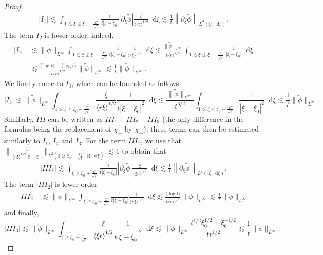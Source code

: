 \documentclass[11 pt]{amsart}
\theoremstyle{definition}
\theoremstyle{remark}
\numberwithin{equation}{section}
\newcommand{\dd}{\mathop{}\!\mathrm{d}}
\begin{document}
\begin{proof}
\begin{align*}
| I_1 | \lesssim \int_{ 1 \lesssim \xi \leq \xi_0 - \frac{C}{\sqrt t}} \frac{1}{t|\xi - \xi_0|} |\partial_\xi \widetilde{\phi}| \frac{\xi}{\langle r \xi\rangle^{1/2}} \dd \xi \lesssim \frac 1 t \left\| \partial_\xi \widetilde{\phi} \right\|_{L^2(|\xi|\dd \xi)}.
\end{align*}
The term $I_2$ is lower order: indeed,
\begin{align*}
|I_2| & \lesssim \| \widetilde{\phi} \|_{L^\infty} \int_{ 1 \lesssim \xi \leq \xi_0 - \frac{C}{\sqrt t}} \frac{1}{t|\xi - \xi_0|} \frac{1}{\langle r \xi\rangle^{1/2} } \dd \xi \lesssim \frac{\| \widetilde{\phi} \|_{L^\infty}}{t \langle r \rangle^{1/2}} \int_{ 1 \lesssim \xi \leq \xi_0 - \frac{C}{\sqrt t}}\frac{1}{|\xi - \xi_0|} \dd \xi \\
& \lesssim \frac{\langle \log t \rangle + \langle \log r \rangle}{t \langle r \rangle^{1/2}} \| \widetilde{\phi} \|_{L^\infty} \lesssim \frac 1 t \| \widetilde{\phi} \|_{L^\infty}.
\end{align*}
We finally come to $I_3$, which can be bounded as follows
$$
|I_3| \lesssim  \| \widetilde{\phi} \|_{L^\infty} \int_{ 1 \lesssim \xi \leq \xi_0 - \frac{C}{\sqrt t}} \frac{\xi}{\langle r \xi \rangle^{1/2}} \frac{1}{t |\xi - \xi_0|^2} \dd \xi \lesssim \frac{\| \widetilde{\phi} \|_{L^\infty}}{t^{3/2}} \int_{ 1 \lesssim \xi \leq \xi_0 - \frac{C}{\sqrt t}} \frac{1}{ |\xi - \xi_0|^2} \dd \xi \lesssim \frac{1}{t} \|  \widetilde{\phi} \|_{L^\infty}.
$$
Similarly, $III$ can be written as $III_1 + III_2 + III_3$ (the only difference in the formulas being the replacement of $\chi_-$ by $\chi_+$); these terms can then be estimated similarly to $I_1$, $I_2$ and $I_3$. For the term $III_1$, we use that
$\| \frac{1}{\langle r \xi\rangle^{1/2} |\xi - \xi_0|}\|_{L^2( \xi \geq \xi_0 + \frac{C}{\sqrt t},\ |\xi|\dd \xi)} \lesssim 1$ to obtain that
\begin{align*}
| III_1 | \lesssim \int_{ \xi \geq \xi_0 + \frac{C}{\sqrt t}} \frac{1}{t|\xi - \xi_0|} |\partial_\xi \widetilde{\phi}| \frac{\xi}{\langle \xi r \rangle^{1/2}} \dd \xi \lesssim \frac 1 t \left\| \partial_\xi \widetilde{\phi} \right\|_{L^2(|\xi|\dd \xi)}.
\end{align*}
The term $|III_2|$ is lower order
\begin{align*}
|III_2| & \lesssim \| \widetilde{\phi} \|_{L^\infty} \int_{  \xi \geq \xi_0 + \frac{C}{\sqrt t}} \frac{1}{t|\xi - \xi_0|} \frac{1}{\langle r \xi \rangle^{1/2}} \dd \xi \lesssim \frac{\langle \log t \rangle }{t \langle r \rangle^{1/2}} \| \widetilde{\phi} \|_{L^\infty} \lesssim \frac 1 t \| \widetilde{\phi} \|_{L^\infty}
\end{align*}
and finally,
$$
|III_3| \lesssim  \| \widetilde{\phi} \|_{L^\infty} \int_{ \xi \geq \xi_0 + \frac{C}{\sqrt t}} \frac{\xi}{\langle \xi r \rangle^{1/2}} \frac{1}{t |\xi - \xi_0|^2} \dd \xi \lesssim \| \widetilde{\phi} \|_{L^\infty} \frac{t^{1/2} \xi_0^{1/2} + \xi_0^{-1/2}}{t r^{1/2}} \lesssim \frac{1}{t} \|  \widetilde{\phi} \|_{L^\infty}.
$$


\end{proof}
\end{document}
